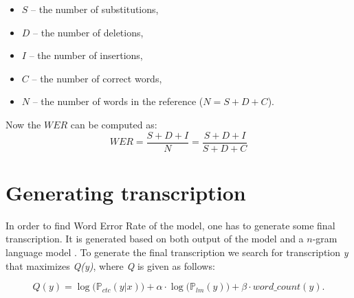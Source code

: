 \documentclass[licencjacka,en]{pracamgr}
\begin{document}
\begin{itemize}
  \item $S$ -- the number of substitutions,
  \item $D$ -- the number of deletions,
  \item $I$ -- the number of insertions,
  \item $C$ -- the number of correct words,
  \item $N$ -- the number of words in the reference ($N=S+D+C$).
\end{itemize}
Now the $WER$ can be computed as:
$$
WER = \frac{S + D + I}{N} = \frac{S + D + I}{S + D + C}
$$

\section{Generating transcription}
In order to find Word Error Rate of the model, one has to generate some final transcription. It is generated based on both output of the model and a $n$-gram language model \cite{DS9}. To generate the final transcription we search for transcription \textit{y} that maximizes \textit{Q(y)}, where \textit{Q} is given as follows:

$$
Q(y) = \log \big(\mathbb{P}_{ctc}(y|x)\big) + \alpha \cdot \log \big( \mathbb{P}_{lm}(y) \big) + \beta \cdot word\_count(y).
$$
\end{document}
